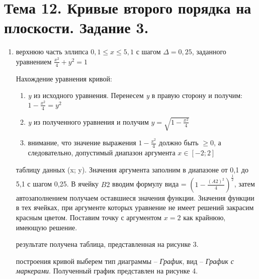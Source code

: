 \section{Тема 12. Кривые второго порядка на плоскости. Задание 3.}
\label{sec:task12}

\begin{enumerate}
	\item{} верхнюю часть эллипса $0,1 \leq x \leq 5,1$ с шагом $\Delta = 0,25$, заданного уравнением $\frac{x^2}{4} + y^2 = 1$

    \begin{item}
		Нахождение уравнения кривой:
		\begin{enumerate}
			\item{} \textit{y} из исходного уравнения. Перенесем \textit{y} в правую сторону и получим: $1 - \frac{x^2}{4} = y^2$
			\item{} \textit{y} из полученного уравнения и получим $y = \sqrt{1 - \frac{x^2}{4}}$
			\item{} внимание, что значение выражения $1 - \frac{x^2}{4}$ должно быть $\geq 0$, а следовательно, допустимый диапазон аргумента $x \in [-2;2]$
		\end{enumerate}
	\end{item}

	\begin{item}
		 таблицу данных (x; y). Значения аргумента заполним в диапазоне от 0,1 до 5,1 с шагом 0,25. В ячейку $B2$ вводим формулу вида = $(1 - \frac{(A2) ^ 2}{4}) ^ \frac{1}{2}$, затем автозаполнением получаем оставшиеся значения функции. Значения функции в тех ячейках, при аргументе которых уравнение не имеет решений закрасим красным цветом. Поставим точку с аргументом $x = 2$ как крайнюю, имеющую решение.

		 результате получена таблица, представленная на рисунке 3.

        \newpage

		 построения кривой выберем тип диаграммы -- \textit{График}, вид -- \textit{График с маркерами}. Полученный график представлен на рисунке 4.

	\end{item}
\end{enumerate}